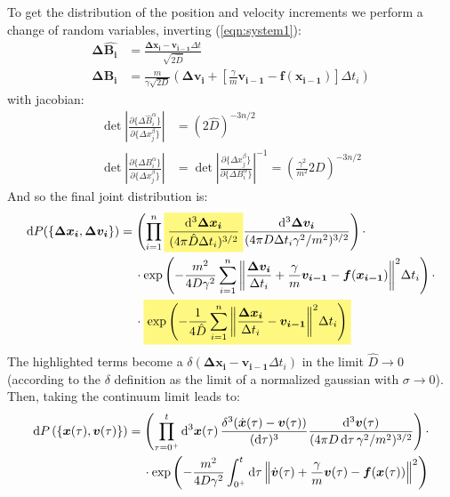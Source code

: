 \documentclass[../template.tex]{subfiles}
\begin{document}
\begin{exo}
    To get the distribution of the position and velocity increments we perform a change of random variables, inverting (\ref{eqn:system1}):
    \begin{align*}
        \bm{\Delta \hat{B_i}} &= \frac{\bm{\Delta x_i} - \bm{v_{i-1} } \Delta t}{\sqrt{2 \hat{D}}} \\
        \bm{\Delta {B}_i} &= \frac{m}{\gamma \sqrt{2 D}} \left(\bm{\Delta v_i } + \left[\frac{\gamma}{m} \bm{v_{i-1}} - \bm{f}(\bm{x_{i-1}}) \right] \Delta t_i \right)
    \end{align*}
    with jacobian:
    \begin{align*}
        \operatorname{det}\left |\frac{\partial \{ \Delta \hat{B}_i^\alpha \}}{ \partial \{ \Delta x_j^\beta \}}  \right| &= (2 \hat{D})^{-3n/2} \\
        \operatorname{det}\left |\frac{\partial \{ \Delta {B}_i^\alpha \}}{ \partial \{ \Delta x_j^\beta \}}  \right| &= \operatorname{det}\left |\frac{\partial \{ \Delta x_j^\beta \}}{ \partial \{ \Delta {B}_i^\alpha  \}}  \right|^{-1} = \left(\frac{\gamma^2}{m^2} 2 D \right)^{-3n/2}
    \end{align*}
    And so the final joint distribution is:
    \begin{align*}
        \dd{P(\{\bm{\Delta x_i}, \bm{\Delta v_i}\})} &= \left(\prod_{i=1}^n \hlc{Yellow}{\frac{\dd[3]\bm{\Delta x_i}}{(4 \pi \hat{D}\Delta t_i)^{3/2}}} \frac{\dd[3]{\bm{\Delta v_i}}}{(4 \pi D \Delta t_i \gamma^2/m^2)^{3/2}} \right)  \cdot\\
        &\quad \> \cdot \exp\left(-\frac{m^2}{4 D \gamma^2} \sum_{i=1}^n \norm{\frac{\bm{\Delta v_i}}{\Delta t_i} + \frac{\gamma}{m} \bm{v_{i-1}} - \bm{f}(\bm{x_{i-1}})}^2 \Delta t_i \right) \cdot \\
        &\quad \> \cdot \hlc{Yellow}{\exp\left(-\frac{1}{4 \hat{D}} \sum_{i=1}^n \norm{\frac{\bm{\Delta x_i}}{\Delta t_i} - \bm{v_{i-1}} }^2 \Delta t_i \right)}
    \end{align*}
    The highlighted terms become a $\delta(\bm{\Delta x_i} - \bm{v_{i-1}}\Delta t_i)$ in the limit $\hat{D} \to 0$ (according to the $\delta$ definition as the limit of a normalized gaussian with $\sigma \to 0$). Then, taking the continuum limit leads to:
    \begin{align*}
        \dd{P}(\{\bm{x}(\tau), \bm{v}(\tau)\}) &= \left(\prod_{\tau=0^+}^t  \dd[3]{\bm{x}(\tau)} \frac{\delta^3(\dot{\bm{x}}(\tau) - \bm{v}(\tau))}{(\dd{\tau})^3}\frac{\dd[3]{\bm{v}(\tau)}}{(4 \pi D \dd{\tau} \gamma^2/m^2)^{3/2}} \right) \cdot\\
        &\quad \> \cdot \exp \left(-\frac{m^2}{4D \gamma^2} \int_{0^+}^t \dd{\tau} \norm{\dot{\bm{v}}(\tau) + \frac{\gamma}{m} \bm{v}(\tau) - \bm{f}(\bm{x}(\tau))  }^2 \right)
    \end{align*} 
\end{exo}
\end{document}

